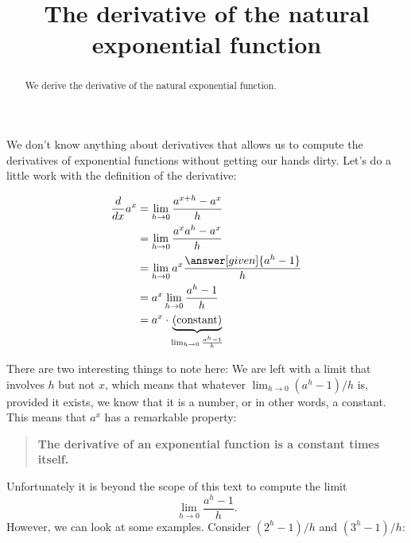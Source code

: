 \documentclass{ximera}
\title[Dig-In:]{The derivative of the natural exponential function}
\begin{document}
\begin{abstract}
  We derive the derivative of the natural exponential function.
\end{abstract}
\maketitle

We don't know anything about derivatives that allows us to compute the
derivatives of exponential functions without getting our hands
dirty. Let's do a little work with the definition of the derivative:
\begin{explanation}
	\begin{align*}
		\ddx a^x &=\lim_{h\to 0} \frac{a^{x+h}-a^x}{h} \\
			&=\lim_{h\to 0} \frac{a^xa^{h}-a^x}{h} \\
			&=\lim_{h\to 0} a^x\frac{\answer[given]{a^{h}-1}}{h} \\
			&=a^x\lim_{h\to 0} \frac{a^{h}-1}{h} \\
			&=a^x \cdot \underbrace{\text{(constant)}}_{\lim_{h\to 0} \frac{a^{h}-1}{h}}
	\end{align*}
\end{explanation}

There are two interesting things to note here: We are left with a
limit that involves $h$ but not $x$, which means that whatever 
$\lim_{h\to 0} (a^h-1)/h$ is, provided it exists, we know that it is a number, or in other words, a constant. 
This means that $a^x$ has a remarkable property:
\begin{quote}
  \textbf{The derivative of an exponential function is a constant
    times itself.}
\end{quote}
Unfortunately it is beyond the scope of this text to compute the limit
\[ \lim_{h\to 0} \frac{a^h-1}{h}.\]
However, we can look at some examples. Consider $(2^h-1)/h$ and $(3^h-1)/h$:
\end{document}
